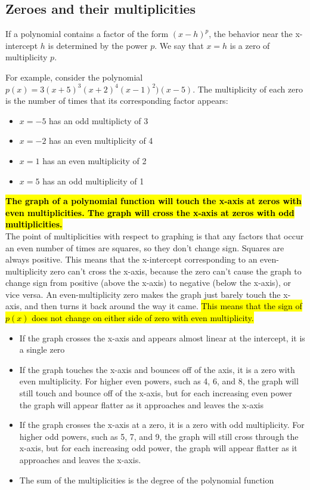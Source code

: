 \documentclass{book}
\begin{document}
	\subsection{Zeroes and their multiplicities}
	If a polynomial contains a factor of the form $(x-h)^p$, the behavior near the x-intercept $h$ is determined by the power $p$. We say that $x=h$ is a zero of multiplicity $p$.
	
	For example, consider the polynomial $p(x) = 3(x+5)^3(x+2)^4(x-1)^2)(x-5)$. The multiplicity of each zero is the number of times that its corresponding factor appears:
	
	\begin{itemize}
		\item $x=-5$ has an odd multiplicty of 3
		\item $x=-2$ has an even multiplicity of 4
		\item $x=1$ has an even multiplicity of 2
		\item $x=5$ has an odd multiplicity of 1
	\end{itemize}
	
	\textbf{\hl{The graph of a polynomial function will touch the x-axis at zeros with even multiplicities. The graph will cross the x-axis at zeros with odd multiplicities.}} \\
	
	The point of multiplicities with respect to graphing is that any factors that occur an even number of times are squares, so they don't change sign. Squares are always positive. This means that the x-intercept corresponding to an even-multiplicity zero can't cross the x-axis, because the zero can't cause the graph to change sign from positive (above the x-axis) to negative (below the x-axis), or vice versa.  An even-multiplicity zero makes the graph just barely touch the x-axis, and then turns it back around the way it came. \hl{This means that the sign of $p(x)$ does not change on either side of zero with even multiplicity.}
	
	\begin{itemize}
		\item If the graph crosses the x-axis and appears almost linear at the intercept, it is a single zero
		\item If the graph touches the x-axis and bounces off of the axis, it is a zero with even multiplicity. For higher even powers, such as 4, 6, and 8, the graph will still touch and bounce off of the x-axis, but for each increasing even power the graph will appear flatter as it approaches and leaves the x-axis
		\item If the graph crosses the x-axis at a zero, it is a zero with odd multiplicity. For higher odd powers, such as 5, 7, and 9, the graph will still cross through the x-axis, but for each increasing odd power, the graph will appear flatter as it approaches and leaves the x-axis.
		\item The sum of the multiplicities is the degree of the polynomial function
	\end{itemize}
	
\end{document}
